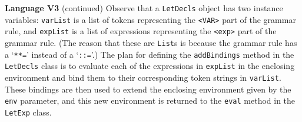 \begin{minipage}[t]{\sw}
\slidenumber
\LARGE
{\bf Language V3} (continued)\exx
\Large
\emm{}\exx
\LARGE
Observe that a \verb'LetDecls' object
has two instance variables:
\verb'varList' is a list of tokens
representing the \verb'<VAR>' part of the grammar rule,
and \verb'expList' is a list of expressions
representing the \verb'<exp>' part of the grammar rule.
(The reason that these are \verb'List's is because
the grammar rule has a `\verb'**='' instead of a `\verb'::=''.)\exx
The plan for defining the \verb'addBindings' method
in the \verb'LetDecls' class
is to evaluate each of the expressions in \verb'expList'
in the enclosing environment
and bind them to their corresponding token strings in \verb'varList'.
These bindings are then used to extend the enclosing environment
given by the \verb'env' parameter,
and this new environment is returned to the \verb'eval' method
in the \verb'LetExp' class.\exx
\end{minipage}
